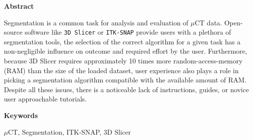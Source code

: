 
\newcommand*{\AbstractHead}[1]{%
	{\noindent\color{header-blue}\Large\textbf{#1}}
	\vspace{10pt}\\
}%

\newcommand*{\SomeSpace}{%
	\vspace{\baselineskip}
}

\AbstractHead{Abstract}
\noindent
\normalsize
\begin{body}
	Segmentation is a common task for analysis and evaluation of $\mu$CT data. Open-source software like \texttt{3D Slicer} or \texttt{ITK-SNAP} provide users with a plethora of segmentation tools, the selection of the correct algorithm for a given task has a non-negligible influence on outcome and required effort by the user. Furthermore, because 3D Slicer requires approximately 10 times more random-access-memory (RAM) than the size of the loaded dataset, user experience also plays a role in picking a segmentation algorithm compatible with the available amount of RAM.
	Despite all these issues, there is a noticeable lack of instructions, guides, or novice user approachable tutorials.
\end{body}

\SomeSpace
\AbstractHead{Keywords}
\label{s:Keywords}
\normalsize
\noindent
\begin{body}
	\noindent
	$\mu$CT, Segmentation, ITK-SNAP, 3D Slicer
\end{body}
\glsresetall
\SomeSpace

\SomeSpace
\normalsize

\glsresetall
